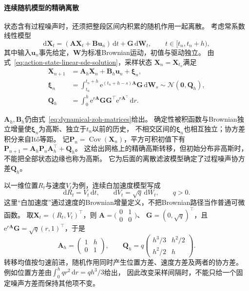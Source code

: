 \paragraph{连续随机模型的精确离散}
\label{sec:dynamical-exact-stochastic-discretization}
状态含有过程噪声时，还须把整段区间内积累的随机作用一起离散。
考虑常系数线性模型
\[
 \mathrm d\bm X_t=(\bm A\bm X_t+\bm B\bm u_n)\,\mathrm dt
                                  +\bm G\,\mathrm d\bm W_t,
 \qquad t\in[t_n,t_n+h),
\]
其中输入$\bm u_n$事先给定，$\bm W$为标准Brownian运动，初值与驱动独立。
由式~\eqref{eq:action-state-linear-sde-solution}，采样状态
$\bm X_n=\bm X_{t_n}$满足
\begin{equation}
 \begin{aligned}
 \bm X_{n+1}&=\bm A_h\bm X_n+\bm B_h\bm u_n+\bm\xi_n,\\
 \bm\xi_n&=\int_{t_n}^{t_n+h}
       \mathrm e^{(t_n+h-s)\bm A}\bm G\,\mathrm d\bm W_s
       \sim\mathcal N(\bm0,\bm Q_h),\\
 \bm Q_h&=\int_0^h\mathrm e^{r\bm A}\bm G\bm G^\top
                              \mathrm e^{r\bm A^\top}\,\mathrm dr.
 \end{aligned}
 \label{eq:dynamical-exact-stochastic-discretization}
\end{equation}

$\bm A_h,\bm B_h$仍由式~\eqref{eq:dynamical-zoh-matrices}给出。
确定性被积函数与Brownian独立增量使$\bm\xi_n$为高斯、独立于$t_n$以前的历史，
不相交区间的$\bm\xi_n$也相互独立；协方差积分来自Itô等距。
记$\bm P_n=\operatorname{Cov}(\bm X_n)$，平方可积初值下有
$\bm P_{n+1}=\bm A_h\bm P_n\bm A_h^\top+\bm Q_h$。
这给出网格上的精确高斯转移，但初始分布非高斯时，不能把全部状态边缘也称为高斯。
它为后面的离散滤波模型确定了过程噪声协方差$\bm Q_h$。

以一维位置$R_t$与速度$V_t$为例，连续白加速度模型写成
\[
 \mathrm dR_t=V_t\,\mathrm dt,\qquad
 \mathrm dV_t=\sqrt q\,\mathrm dW_t,\qquad q>0.
\]
这里“白加速度”通过速度的Brownian增量定义，不把Brownian路径当作普通可微函数。
取$\bm X_t=(R_t,V_t)^\top$，则
$\bm A=\bigl(\begin{smallmatrix}0&1\\0&0\end{smallmatrix}\bigr)$、
$\bm G=(0,\sqrt q)^\top$，且
$\mathrm e^{r\bm A}\bm G=\sqrt q(r,1)^\top$，于是
\begin{equation}
 \bm A_h=\begin{pmatrix}1&h\\0&1\end{pmatrix},\qquad
 \bm Q_h=q\begin{pmatrix}h^3/3&h^2/2\\h^2/2&h\end{pmatrix}.
 \label{eq:dynamical-white-acceleration-discretization}
\end{equation}
转移均值按匀速前进，随机作用同时产生位置方差、速度方差及两者的协方差。
例如位置方差由$\int_0^h qr^2\,\mathrm dr=qh^3/3$给出，
因此改变采样间隔时，不能只给一个固定噪声方差而保持其他项不变。


